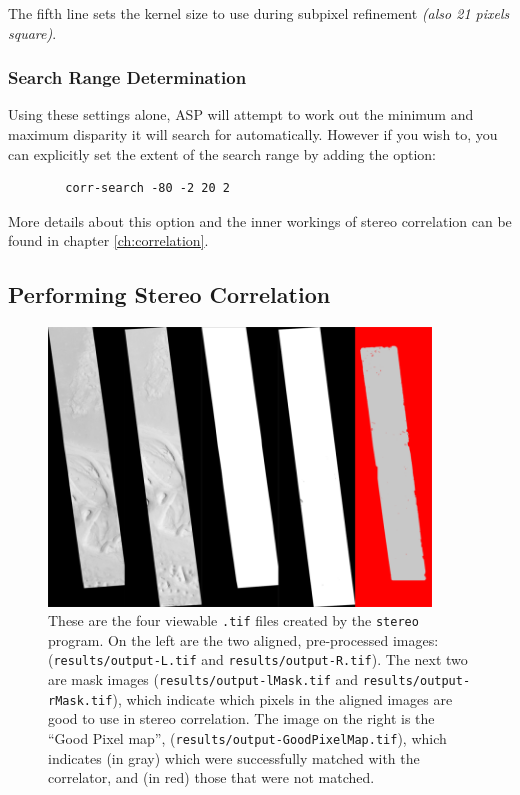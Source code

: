 The fifth line sets the kernel size to use during subpixel refinement
\textit{(also 21 pixels square)}.

\subsubsection*{Search Range Determination}

Using these settings alone, \ac{ASP} will attempt to work out the
minimum and maximum disparity it will search for automatically. However if you
wish to, you can explicitly set the extent of the search range by
adding the option:
\begin{verbatim}
        corr-search -80 -2 20 2
\end{verbatim}

More details about this option and the inner workings of stereo correlation
can be found in chapter \ref{ch:correlation}.

\subsection{Performing Stereo Correlation}\label{perform-stereo}

\begin{figure}[t!]
\begin{minipage}{4in}
\includegraphics[width=4in]{images/p19-stereo-output_400px.png}
\end{minipage}
\hfill
\begin{minipage}{2.9in}
\caption[P19 stereo output images]{
    \label{p19-stereo-output}
        These are the four viewable \texttt{.tif} files created by the
        \texttt{stereo} program.  On the left are the two aligned,
        pre-processed images: (\texttt{results/output-L.tif} and
        \texttt{results/output-R.tif}).  The next two are mask images
        (\texttt{results/output-lMask.tif} and
        \texttt{results/output-rMask.tif}), which indicate which
        pixels in the aligned images are good to use in stereo
        correlation.  The image on the right is the ``Good Pixel
        map'', (\texttt{results/output-GoodPixelMap.tif}), which
        indicates (in gray) which were successfully matched with the
        correlator, and (in red) those that were not matched.}
\end{minipage}
\end{figure}

